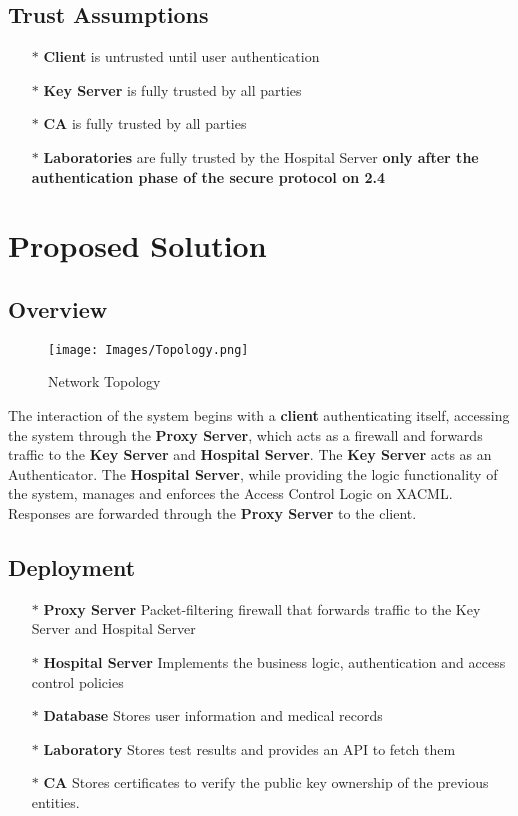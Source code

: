 \documentclass{article}
\begin{document}
\subsection{Trust Assumptions}
\begin{itemize}
	\item[$\ast$] {\bf Client} is untrusted until user authentication
	\item[$\ast$] {\bf Key Server} is fully trusted by all parties
	\item[$\ast$] {\bf CA} is fully trusted by all parties
	\item[$\ast$] {\bf Laboratories} are fully trusted by the Hospital Server {\bf only after the authentication phase of the secure protocol on 2.4} 

\end{itemize}


\section{Proposed Solution}
\subsection{Overview}
\begin{figure}[!ht]
	\texttt{[image: Images/Topology.png]}
	\caption{Network Topology}
\end{figure}
The interaction of the system begins with a {\bf client} authenticating itself, accessing the system through the {\bf Proxy Server}, which acts as a firewall and forwards traffic to the {\bf Key Server} and {\bf Hospital Server}. The {\bf Key Server} acts as an Authenticator. The {\bf Hospital Server}, while providing the logic functionality of the system, manages and enforces the Access Control Logic on XACML. Responses are forwarded through the {\bf Proxy Server} to the client.

\subsection{Deployment}

\begin{itemize}
\item[$\ast$] {\bf Proxy Server} Packet-filtering firewall that forwards traffic to the Key Server and Hospital Server
\item[$\ast$] {\bf Hospital Server} Implements the business logic, authentication and access control policies
\item[$\ast$] {\bf Database} Stores user information and medical records
\item[$\ast$] {\bf Laboratory} Stores test results and provides an API to fetch them
\item[$\ast$] {\bf CA} Stores certificates to verify the public key ownership of the previous entities.
\end{itemize}
\end{document}
